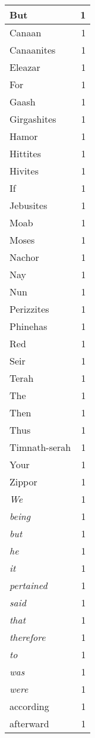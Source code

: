 \begin{center}
\begin{longtable}{l|r}
But & 1 \\ \hline
Canaan & 1 \\ \hline
Canaanites & 1 \\ \hline
Eleazar & 1 \\ \hline
For & 1 \\ \hline
Gaash & 1 \\ \hline
Girgashites & 1 \\ \hline
Hamor & 1 \\ \hline
Hittites & 1 \\ \hline
Hivites & 1 \\ \hline
If & 1 \\ \hline
Jebusites & 1 \\ \hline
Moab & 1 \\ \hline
Moses & 1 \\ \hline
Nachor & 1 \\ \hline
Nay & 1 \\ \hline
Nun & 1 \\ \hline
Perizzites & 1 \\ \hline
Phinehas & 1 \\ \hline
Red & 1 \\ \hline
Seir & 1 \\ \hline
Terah & 1 \\ \hline
The & 1 \\ \hline
Then & 1 \\ \hline
Thus & 1 \\ \hline
Timnath-serah & 1 \\ \hline
Your & 1 \\ \hline
Zippor & 1 \\ \hline
\emph{We} & 1 \\ \hline
\emph{being} & 1 \\ \hline
\emph{but} & 1 \\ \hline
\emph{he} & 1 \\ \hline
\emph{it} & 1 \\ \hline
\emph{pertained} & 1 \\ \hline
\emph{said} & 1 \\ \hline
\emph{that} & 1 \\ \hline
\emph{therefore} & 1 \\ \hline
\emph{to} & 1 \\ \hline
\emph{was} & 1 \\ \hline
\emph{were} & 1 \\ \hline
according & 1 \\ \hline
afterward & 1 \\ \hline

\end{longtable}
\end{center}
